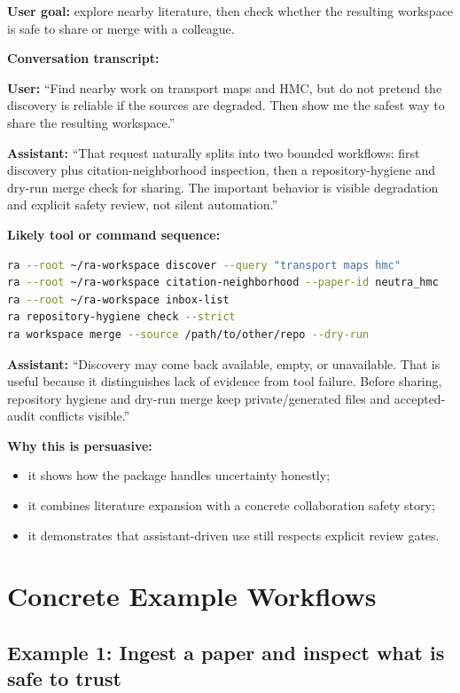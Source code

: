 \documentclass[11pt,a4paper,openany]{book}
\begin{document}
\textbf{User goal:} explore nearby literature, then check whether the resulting
workspace is safe to share or merge with a colleague.

\textbf{Conversation transcript:}

\textbf{User:} ``Find nearby work on transport maps and HMC, but do not pretend
the discovery is reliable if the sources are degraded. Then show me the safest
way to share the resulting workspace.''

\textbf{Assistant:} ``That request naturally splits into two bounded workflows:
first discovery plus citation-neighborhood inspection, then a repository-hygiene
and dry-run merge check for sharing. The important behavior is visible
degradation and explicit safety review, not silent automation.''

\textbf{Likely tool or command sequence:}
\begin{lstlisting}[language=bash]
ra --root ~/ra-workspace discover --query "transport maps hmc"
ra --root ~/ra-workspace citation-neighborhood --paper-id neutra_hmc
ra --root ~/ra-workspace inbox-list
ra repository-hygiene check --strict
ra workspace merge --source /path/to/other/repo --dry-run
\end{lstlisting}

\textbf{Assistant:} ``Discovery may come back available, empty, or unavailable.
That is useful because it distinguishes lack of evidence from tool failure.
Before sharing, repository hygiene and dry-run merge keep private/generated files
and accepted-audit conflicts visible.''

\textbf{Why this is persuasive:}
\begin{itemize}[nosep]
  \item it shows how the package handles uncertainty honestly;
  \item it combines literature expansion with a concrete collaboration safety story;
  \item it demonstrates that assistant-driven use still respects explicit review gates.
\end{itemize}

\chapter{Concrete Example Workflows}

\section{Example 1: Ingest a paper and inspect what is safe to trust}
\end{document}
